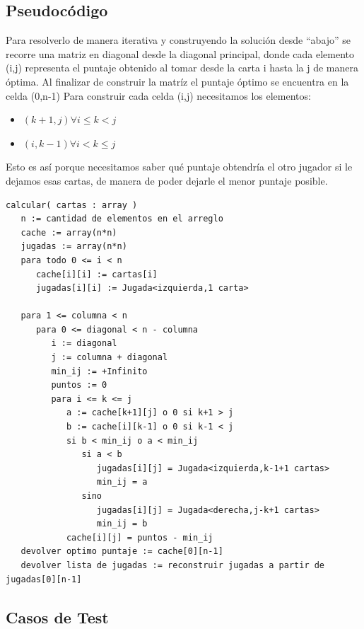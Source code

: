 \subsection{Pseudoc\'odigo}
Para resolverlo de manera iterativa y construyendo la solución desde ``abajo'' se recorre una matriz
en diagonal desde la diagonal principal, donde cada elemento (i,j) representa el puntaje obtenido
al tomar desde la carta i hasta la j de manera óptima. Al finalizar de construir la matríz el puntaje
óptimo se encuentra en la celda (0,n-1)
Para construir cada celda (i,j) necesitamos los elementos:

\begin{itemize}
   \item $(k+1,j) \forall i \le k < j$
   \item $(i,k-1) \forall i < k \le j$
\end{itemize}

Esto es así porque necesitamos saber qué puntaje obtendría el otro jugador si le dejamos esas cartas,
de manera de poder dejarle el menor puntaje posible.

\begin{verbatim}
calcular( cartas : array )
   n := cantidad de elementos en el arreglo
   cache := array(n*n)
   jugadas := array(n*n)
   para todo 0 <= i < n
      cache[i][i] := cartas[i]
      jugadas[i][i] := Jugada<izquierda,1 carta>

   para 1 <= columna < n
      para 0 <= diagonal < n - columna
         i := diagonal
         j := columna + diagonal
         min_ij := +Infinito
         puntos := 0
         para i <= k <= j
            a := cache[k+1][j] o 0 si k+1 > j
            b := cache[i][k-1] o 0 si k-1 < j
            si b < min_ij o a < min_ij
               si a < b
                  jugadas[i][j] = Jugada<izquierda,k-1+1 cartas>
                  min_ij = a
               sino
                  jugadas[i][j] = Jugada<derecha,j-k+1 cartas>
                  min_ij = b
            cache[i][j] = puntos - min_ij
   devolver optimo puntaje := cache[0][n-1]
   devolver lista de jugadas := reconstruir jugadas a partir de jugadas[0][n-1]
\end{verbatim}

\subsection{Casos de Test}

